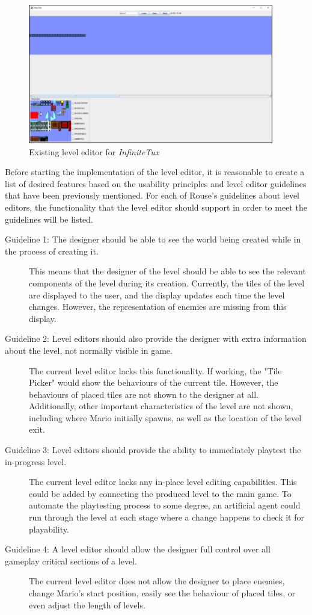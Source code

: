 \begin{figure}[h]
    \centering
    \includegraphics[width=0.8\linewidth]{img/fig11-ift-editor.png}
    \caption{Existing level editor for \emph{InfiniteTux}}
    \label{fig:more-chunks}
\end{figure}

Before starting the implementation of the level editor, it is reasonable to create a list
of desired features based on the usability principles and level editor guidelines that have
been previously mentioned. For each of Rouse's guidelines about level editors, the
functionality that the level editor should support in order to meet the guidelines will be
listed.

\begin{description}
    \item [Guideline 1: The designer should be able to see the world being created while in the process of creating it.] This means that the designer of the level should be able to see the relevant components of the level during its creation. Currently, the tiles of the level are displayed to the user, and the display updates each time the level changes. However, the representation of enemies are missing from this display.
    \item [Guideline 2: Level editors should also provide the designer with extra information about the level, not normally visible in game.] The current level editor lacks this functionality. If working, the "Tile Picker" would show the behaviours of the current tile. However, the behaviours of placed tiles are not shown to the designer at all. Additionally, other important characteristics of the level are not shown, including where Mario initially spawns, as well as the location of the level exit.
    \item [Guideline 3: Level editors should provide the ability to immediately playtest the in-progress level.] The current level editor lacks any in-place level editing capabilities. This could be added by connecting the produced level to the main game. To automate the playtesting process to some degree, an artificial agent could run through the level at each stage where a change happens to check it for playability.
    \item [Guideline 4: A level editor should allow the designer full control over all gameplay critical sections of a level.] The current level editor does not allow the designer to place enemies, change Mario's start position, easily see the behaviour of placed tiles, or even adjust the length of levels.
\end{description}

